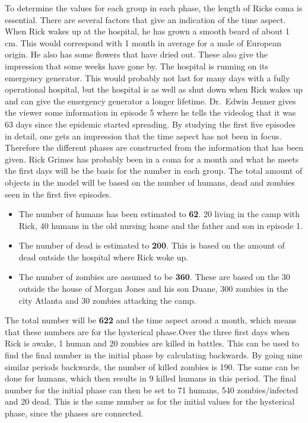 \documentclass[%
twoside,                 %
final,                   %
10pt]{article}
\begin{document}
\vspace{3mm}




\vspace{3mm}


To determine the values for each group in each phase, the length of Ricks coma is essential. There are several factors that give an indication of the time aspect. When Rick wakes up at the hospital, he has grown a smooth beard of about 1 cm. This would correspond with 1 month in average for a male of European origin. He also has some flowers that have dried out. These also give the impression that some weeks have gone by. The hospital is running on its emergency generator. This would probably not last for many days with a fully operational hospital, but the hospital is as well as shut down when Rick wakes up and can give the emergency generator a longer lifetime. Dr.~Edwin Jenner gives the viewer some information in episode 5 where he tells the videolog that it was 63 days since the epidemic started spreading. By studying the first five episodes in detail, one gets an impression that the time aspect has not been in focus. Therefore the different phases are constructed from the information that has been given. Rick Grimes has probably been in a coma for a month and what he meets the first days will be the basis for the number in each group. The total amount of objects in the model will be based on the number of humans, dead and zombies seen in the first five episodes. 
\begin{itemize}
 \item The number of humans has been estimated to \textbf{62}. 20 living in the camp with Rick, 40 humans in the old nursing home and the father and son in episode 1. 

 \item The number of dead is estimated to \textbf{200}. This is based on the amount of dead outside the hospital where Rick woke up. 

 \item The number of zombies are assumed to be \textbf{360}. These are based on the 30 outside the house of Morgan Jones and his son Duane, 300 zombies in the city Atlanta and 30 zombies attacking the camp. 
\end{itemize}

\noindent
The total number will be \textbf{622} and the time aspect aroud a month, which means that these numbers are for the hysterical phase.Over the three first days when Rick is awake, 1 human and 20 zombies are killed in battles. This can be used to find the final number in the initial phase by calculating backwards. By going nine similar periods backwards, the number of killed zombies is 190. The same can be done for humans, which then results in 9 killed humans in this period. The final number for the initial phase can then be set to 71 humans, 540 zombies/infected and 20 dead. This is the same number as for the initial values for the hysterical phase, since the phases are connected.
\end{document}
